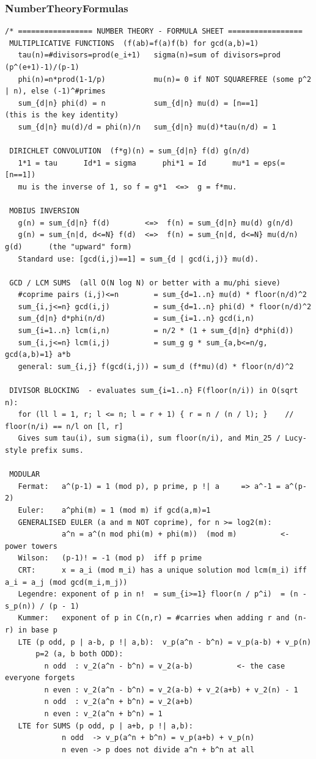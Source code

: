 \documentclass[9pt,a4paper,twocolumn]{extarticle}
\begin{document}
\subsubsection{NumberTheoryFormulas}
\nopagebreak
\begin{lstlisting}
/* ================= NUMBER THEORY - FORMULA SHEET =================
 MULTIPLICATIVE FUNCTIONS  (f(ab)=f(a)f(b) for gcd(a,b)=1)
   tau(n)=#divisors=prod(e_i+1)   sigma(n)=sum of divisors=prod (p^(e+1)-1)/(p-1)
   phi(n)=n*prod(1-1/p)           mu(n)= 0 if NOT SQUAREFREE (some p^2 | n), else (-1)^#primes
   sum_{d|n} phi(d) = n           sum_{d|n} mu(d) = [n==1]        (this is the key identity)
   sum_{d|n} mu(d)/d = phi(n)/n   sum_{d|n} mu(d)*tau(n/d) = 1

 DIRICHLET CONVOLUTION  (f*g)(n) = sum_{d|n} f(d) g(n/d)
   1*1 = tau      Id*1 = sigma      phi*1 = Id      mu*1 = eps(=[n==1])
   mu is the inverse of 1, so f = g*1  <=>  g = f*mu.

 MOBIUS INVERSION
   g(n) = sum_{d|n} f(d)        <=>  f(n) = sum_{d|n} mu(d) g(n/d)
   g(n) = sum_{n|d, d<=N} f(d)  <=>  f(n) = sum_{n|d, d<=N} mu(d/n) g(d)      (the "upward" form)
   Standard use: [gcd(i,j)==1] = sum_{d | gcd(i,j)} mu(d).

 GCD / LCM SUMS  (all O(N log N) or better with a mu/phi sieve)
   #coprime pairs (i,j)<=n        = sum_{d=1..n} mu(d) * floor(n/d)^2
   sum_{i,j<=n} gcd(i,j)          = sum_{d=1..n} phi(d) * floor(n/d)^2
   sum_{d|n} d*phi(n/d)           = sum_{i=1..n} gcd(i,n)
   sum_{i=1..n} lcm(i,n)          = n/2 * (1 + sum_{d|n} d*phi(d))
   sum_{i,j<=n} lcm(i,j)          = sum_g g * sum_{a,b<=n/g, gcd(a,b)=1} a*b
   general: sum_{i,j} f(gcd(i,j)) = sum_d (f*mu)(d) * floor(n/d)^2

 DIVISOR BLOCKING  - evaluates sum_{i=1..n} F(floor(n/i)) in O(sqrt n):
   for (ll l = 1, r; l <= n; l = r + 1) { r = n / (n / l); }    // floor(n/i) == n/l on [l, r]
   Gives sum tau(i), sum sigma(i), sum floor(n/i), and Min_25 / Lucy-style prefix sums.

 MODULAR
   Fermat:   a^(p-1) = 1 (mod p), p prime, p !| a     => a^-1 = a^(p-2)
   Euler:    a^phi(m) = 1 (mod m) if gcd(a,m)=1
   GENERALISED EULER (a and m NOT coprime), for n >= log2(m):
             a^n = a^(n mod phi(m) + phi(m))  (mod m)          <- power towers
   Wilson:   (p-1)! = -1 (mod p)  iff p prime
   CRT:      x = a_i (mod m_i) has a unique solution mod lcm(m_i) iff a_i = a_j (mod gcd(m_i,m_j))
   Legendre: exponent of p in n!  = sum_{i>=1} floor(n / p^i)  = (n - s_p(n)) / (p - 1)
   Kummer:   exponent of p in C(n,r) = #carries when adding r and (n-r) in base p
   LTE (p odd, p | a-b, p !| a,b):  v_p(a^n - b^n) = v_p(a-b) + v_p(n)
       p=2 (a, b both ODD):
         n odd  : v_2(a^n - b^n) = v_2(a-b)          <- the case everyone forgets
         n even : v_2(a^n - b^n) = v_2(a-b) + v_2(a+b) + v_2(n) - 1
         n odd  : v_2(a^n + b^n) = v_2(a+b)
         n even : v_2(a^n + b^n) = 1
   LTE for SUMS (p odd, p | a+b, p !| a,b):
             n odd  -> v_p(a^n + b^n) = v_p(a+b) + v_p(n)
             n even -> p does not divide a^n + b^n at all


\end{lstlisting}
\end{document}
